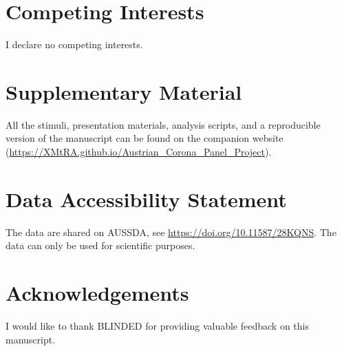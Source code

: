 \documentclass[
  man,mask,floatsintext]{apa7}
\begin{document}
\hypertarget{competing-interests}{%
\section{Competing Interests}\label{competing-interests}}

I declare no competing interests.

\hypertarget{supplementary-material}{%
\section{Supplementary Material}\label{supplementary-material}}

All the stimuli, presentation materials, analysis scripts, and a reproducible version of the manuscript can be found on the companion website (\url{https://XMtRA.github.io/Austrian_Corona_Panel_Project}).

\hypertarget{data-accessibility-statement}{%
\section{Data Accessibility Statement}\label{data-accessibility-statement}}

The data are shared on AUSSDA, see \url{https://doi.org/10.11587/28KQNS}.
The data can only be used for scientific purposes.

\hypertarget{acknowledgements}{%
\section{Acknowledgements}\label{acknowledgements}}

I would like to thank BLINDED for providing valuable feedback on this manuscript.
\end{document}
